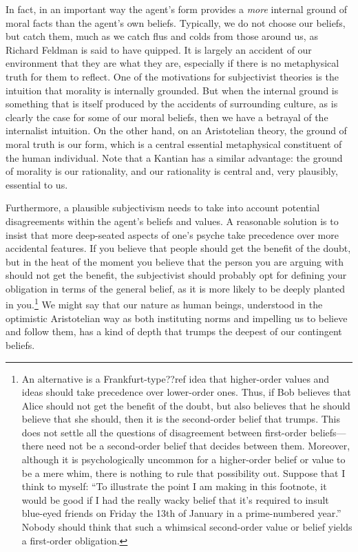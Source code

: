 In fact, in an important way the agent's form provides a \textit{more} internal ground of moral facts than the 
agent's own beliefs. Typically, we do not choose our beliefs, but catch them, much as we 
catch flus and colds from those around us, as Richard Feldman is said to have quipped. It is largely an accident of our environment that they are what they are, especially 
if there is no metaphysical truth for them to reflect. One of the motivations for subjectivist theories is 
the intuition that morality is internally grounded. But when the internal ground is something that is itself
produced by the accidents of surrounding culture, as is clearly the case for some of our moral beliefs, 
then we have a betrayal of the internalist intuition. On the other hand, on an Aristotelian theory, the ground 
of moral truth is our form, which is a central essential metaphysical constituent of the human individual. 
Note that a Kantian has a similar advantage: the ground of morality is our rationality, and our rationality
is central and, very plausibly, essential to us.

Furthermore, a plausible subjectivism needs to take into account potential disagreements within the agent's 
beliefs and values. A reasonable solution is to insist that more deep-seated aspects of one's psyche take 
precedence over more accidental features. If you believe that people should get the benefit of the doubt, but 
in the heat of the moment you believe that the person you are arguing with should not get the benefit, the 
subjectivist should probably opt for defining your obligation in terms of the general belief, as it is more 
likely to be deeply planted in you.\footnote{An alternative is a Frankfurt-type??ref idea that higher-order values and
ideas should take precedence over lower-order ones. Thus, if Bob believes that Alice should not get the benefit
of the doubt, but also believes that he should believe that she should, then it is the second-order belief that
trumps. This does not settle all the questions of disagreement between first-order beliefs---there need not be a 
second-order belief that decides between them. Moreover, although it is psychologically uncommon for a higher-order
belief or value to be a mere whim, there is nothing to rule that possibility out. Suppose that I think to myself:
``To illustrate the point I am making in this footnote, it would be good if I had the really wacky belief that
it's required to insult blue-eyed friends on Friday the 13th of January in a prime-numbered year.'' Nobody
should think that such a whimsical second-order value or belief yields a first-order obligation.} We might say 
that our nature as human beings, understood in the optimistic Aristotelian way as both instituting norms and impelling us 
to believe and follow them, has a kind of depth that trumps the deepest of our contingent beliefs.

